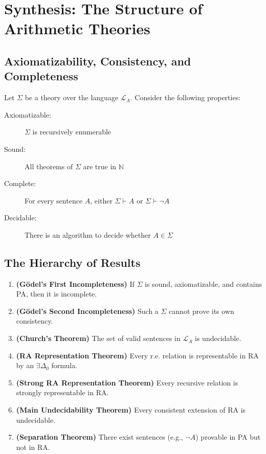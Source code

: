 \documentclass[12pt]{article}
\begin{document}
\section{Synthesis: The Structure of Arithmetic Theories}

\subsection{Axiomatizability, Consistency, and Completeness}

Let \( \Sigma \) be a theory over the language \( \mathcal{L}_A \). Consider the following properties:

\begin{description}
  \item[Axiomatizable:] \( \Sigma \) is recursively enumerable
  \item[Sound:] All theorems of \( \Sigma \) are true in \( \mathbb{N} \)
  \item[Complete:] For every sentence \( A \), either \( \Sigma \vdash A \) or \( \Sigma \vdash \neg A \)
  \item[Decidable:] There is an algorithm to decide whether \( A \in \Sigma \)
\end{description}

\subsection{The Hierarchy of Results}

\begin{enumerate}[label=\textbf{T\arabic*.}]
  \item \textbf{(Gödel’s First Incompleteness)}  
  If \( \Sigma \) is sound, axiomatizable, and contains PA, then it is incomplete.

  \item \textbf{(Gödel’s Second Incompleteness)}  
  Such a \( \Sigma \) cannot prove its own consistency.

  \item \textbf{(Church’s Theorem)}  
  The set of valid sentences in \( \mathcal{L}_A \) is undecidable.

  \item \textbf{(RA Representation Theorem)}  
  Every r.e. relation is representable in RA by an \( \exists \Delta_0 \) formula.

  \item \textbf{(Strong RA Representation Theorem)}  
  Every recursive relation is strongly representable in RA.

  \item \textbf{(Main Undecidability Theorem)}  
  Every consistent extension of RA is undecidable.

  \item \textbf{(Separation Theorem)}  
  There exist sentences (e.g., \( \neg A \)) provable in PA but not in RA.
\end{enumerate}
\end{document}
